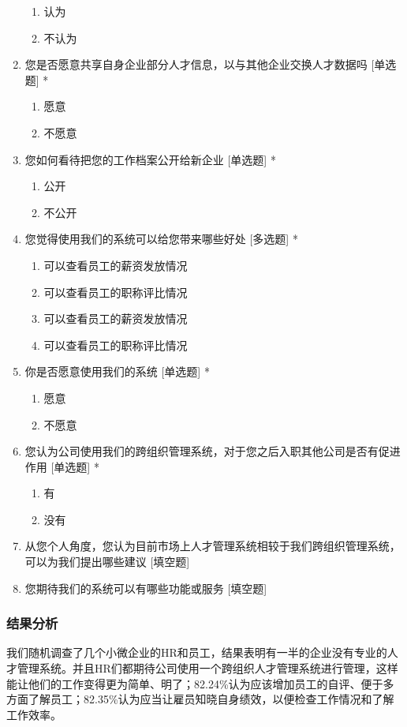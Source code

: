 \documentclass[UTF8]{ctexart}
\begin{document}
\begin{enumerate}[1.]
	\begin{enumerate}
		\item 认为
		\item 不认为
	\end{enumerate}
	\item 您是否愿意共享自身企业部分人才信息，以与其他企业交换人才数据吗 [单选题] *
	\begin{enumerate}
		\item 愿意
		\item 不愿意
	\end{enumerate}
	\item 您如何看待把您的工作档案公开给新企业 [单选题] *
	\begin{enumerate}
		\item 公开
		\item 不公开
	\end{enumerate}
	\item 您觉得使用我们的系统可以给您带来哪些好处 [多选题] *
	\begin{enumerate}
		\item 可以查看员工的薪资发放情况
		\item 可以查看员工的职称评比情况
		\item 可以查看员工的薪资发放情况
		\item 可以查看员工的职称评比情况
	\end{enumerate}

	\item 你是否愿意使用我们的系统 [单选题] *
	\begin{enumerate}
		\item 愿意
		\item 不愿意
	\end{enumerate}
	\item 您认为公司使用我们的跨组织管理系统，对于您之后入职其他公司是否有促进作用 [单选题] *
	\begin{enumerate}
		\item 有
		\item 没有
	\end{enumerate}

	\item 从您个人角度，您认为目前市场上人才管理系统相较于我们跨组织管理系统，可以为我们提出哪些建议 [填空题]
	\item 您期待我们的系统可以有哪些功能或服务 [填空题]
\end{enumerate}
\subsubsection{结果分析}
我们随机调查了几个小微企业的HR和员工，结果表明有一半的企业没有专业的人才管理系统。并且HR们都期待公司使用一个跨组织人才管理系统进行管理，这样能让他们的工作变得更为简单、明了；82.24\%认为应该增加员工的自评、便于多方面了解员工；82.35\%认为应当让雇员知晓自身绩效，以便检查工作情况和了解工作效率。
\end{document}
